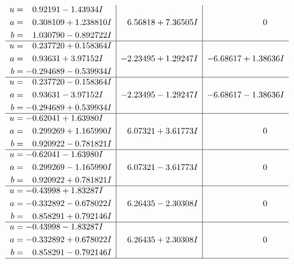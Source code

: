 \documentclass[1p]{elsarticle_modified}
\theoremstyle{definition}
\begin{document}
$$\begin{array}{c|c|c}
\begin{aligned}
u &= \phantom{-}0.92191 - 1.43934 I \\
a &= \phantom{-}0.308109 + 1.238810 I \\
b &= \phantom{-}1.030790 - 0.892722 I\end{aligned}
 & \phantom{-}6.56818 + 7.36505 I & \phantom{-0.000000 } 0 \\ \hline\begin{aligned}
u &= \phantom{-}0.237720 + 0.158364 I \\
a &= \phantom{-}0.93631 + 3.97152 I \\
b &= -0.294689 - 0.539934 I\end{aligned}
 & -2.23495 + 1.29247 I & -6.68617 + 1.38636 I \\ \hline\begin{aligned}
u &= \phantom{-}0.237720 - 0.158364 I \\
a &= \phantom{-}0.93631 - 3.97152 I \\
b &= -0.294689 + 0.539934 I\end{aligned}
 & -2.23495 - 1.29247 I & -6.68617 - 1.38636 I \\ \hline\begin{aligned}
u &= -0.62041 + 1.63980 I \\
a &= \phantom{-}0.299269 + 1.165990 I \\
b &= \phantom{-}0.920922 - 0.781821 I\end{aligned}
 & \phantom{-}6.07321 + 3.61773 I & \phantom{-0.000000 } 0 \\ \hline\begin{aligned}
u &= -0.62041 - 1.63980 I \\
a &= \phantom{-}0.299269 - 1.165990 I \\
b &= \phantom{-}0.920922 + 0.781821 I\end{aligned}
 & \phantom{-}6.07321 - 3.61773 I & \phantom{-0.000000 } 0 \\ \hline\begin{aligned}
u &= -0.43998 + 1.83287 I \\
a &= -0.332892 - 0.678022 I \\
b &= \phantom{-}0.858291 + 0.792146 I\end{aligned}
 & \phantom{-}6.26435 - 2.30308 I & \phantom{-0.000000 } 0 \\ \hline\begin{aligned}
u &= -0.43998 - 1.83287 I \\
a &= -0.332892 + 0.678022 I \\
b &= \phantom{-}0.858291 - 0.792146 I\end{aligned}
 & \phantom{-}6.26435 + 2.30308 I & \phantom{-0.000000 } 0\\
 \hline 
 \end{array}$$\newpage\newpage\renewcommand{\arraystretch}{1}
\end{document}
